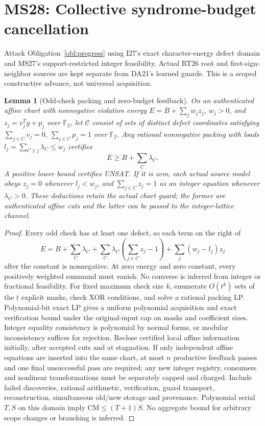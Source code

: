 \documentclass[11pt]{article}
\newtheorem{lemma}[theorem]{Lemma}
\begin{document}
\section{MS28: Collective syndrome-budget cancellation}\label{sec:ms28}
Attack Obligation~\ref{obl:progress} using I27's exact character-energy defect domain and MS27's support-restricted integer feasibility. Actual RT26 root and first-sign-neighbor sources are kept separate from DA21's learned guards. This is a scoped constructive advance, not universal acquisition.
\begin{lemma}[Odd-check packing and zero-budget feedback]\label{lem:ms28-pack}
On an authenticated affine chart with nonnegative violation energy $E=B+\sum_j w_jz_j$, $w_j>0$, and $z_j=v_j^Ty+p_j$ over $\mathbb F_2$, let $\mathcal C$ consist of sets of distinct defect coordinates satisfying $\sum_{j\in C}v_j=0$, $\sum_{j\in C}p_j=1$ over $\mathbb F_2$. Any rational nonnegative packing with loads $l_j=\sum_{C\ni j}\lambda_C\le w_j$ certifies
\[
E\ge B+\sum_C\lambda_C.
\]
A positive lower bound certifies UNSAT. If it is zero, each actual source model obeys $z_j=0$ whenever $l_j<w_j$, and $\sum_{j\in C}z_j=1$ as an integer equation whenever $\lambda_C>0$. These deductions retain the actual chart guard; the former are authenticated affine cuts and the latter can be passed to the integer-lattice channel.
\end{lemma}
\begin{proof}
Every odd check has at least one defect, so each term on the right of
\[
 E=B+\sum_C\lambda_C+\sum_C\lambda_C\left(\sum_{j\in C}z_j-1\right)+\sum_j(w_j-l_j)z_j
\]
after the constant is nonnegative. At zero energy and zero constant, every positively weighted summand must vanish. No converse is inferred from integer or fractional feasibility. For fixed maximum check size $k$, enumerate $O(t^k)$ sets of the $t$ explicit masks, check XOR conditions, and solve a rational packing LP. Polynomial-bit exact LP gives a uniform polynomial acquisition and exact verification bound under the original-input cap on masks and coefficient sizes. Integer equality consistency is polynomial by normal forms, or modular inconsistency suffices for rejection. Reclose certified local affine information initially, after accepted cuts and at stagnation. If only independent affine equations are inserted into the same chart, at most $n$ productive feedback passes and one final unsuccessful pass are required; any new integer registry, consumers and nonlinear transformations must be separately capped and charged. Include failed discoveries, rational arithmetic, verification, guard transport, reconstruction, simultaneous old/new storage and provenance. Polynomial serial $T,S$ on this domain imply $\mathrm{CM}\le(T+1)S$. No aggregate bound for arbitrary scope changes or branching is inferred.
\end{proof}
\end{document}

